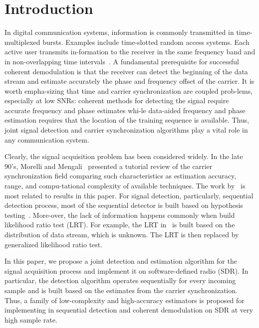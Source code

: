 \section{Introduction}
\label{sec:introduction}

In digital communication systems, information is commonly transmitted in time-multiplexed bursts.
Examples include time-slotted random access systems. Each active user transmits in-formation to the receiver
in the same frequency band and in non-overlapping time intervals~\cite{Falconer_95}. 
A fundamental prerequisite for successful coherent demodulation is that the receiver can
detect the beginning of the data stream and estimate accurately the phase and frequency offset of the carrier.
It is worth empha-sizing that time and carrier synchronization are coupled prob-lems, especially at low SNRs:
coherent methods for detecting the signal require accurate frequency and phase estimates 
whi-le data-aided frequency and phase estimation requires that the location of the training sequence is available.
Thus, joint signal detection and carrier synchronization algorithms play a vital role in any communication system.

Clearly, the signal acquisition problem has been considered widely. 
In the late 90's, Morelli and Mengali~\cite{Morelli_Mengali_98} presented a tutorial review
of the carrier synchronization field comparing such characteristics as estimation accuracy, range,
and compu-tational complexity of available techniques. The work by~\cite{kay_89,Fitz_94,Luise_Reggiannini_95}
is most related to results in this paper. For signal detection,
particularly, sequential detection process, most of the sequential detector
is built based on hypothesis testing~\cite{Ramakrishnan_10,Chiani_06,Liang_15}.
More-over, the lack of information happens commonly when build
likelihood ratio test (LRT). For example, the LRT in~\cite{Chiani_06} 
is built based on the distribution of data stream, which is unknown.
The LRT is then replaced by generalized likelihood ratio test.

In this paper, we propose a joint detection and estimation algorithm 
for the signal acquisition process and implement it on software-defined radio (SDR).
In particular, the detection algorithm operates sequentially for every incoming sample
and is built based on the estimates from the carrier synchronization.
Thus, a family of low-complexity and high-accuracy estimators is proposed for implementing
in sequential detection and coherent demodulation on SDR at very high sample rate.
